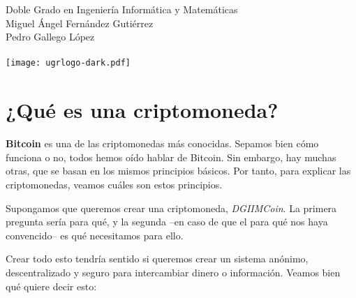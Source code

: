 \documentclass[10pt, a4paper]{article}
\theoremstyle{theorem-style}
\theoremstyle{theorem-style}
\theoremstyle{definition-style}
\theoremstyle{remark-style}
\theoremstyle{example-style}
\theoremstyle{definition-style}
\theoremstyle{remark-style}
\newcommand{\autor}{Miguel Ángel Fernández Gutiérrez\\Pedro Gallego López\\\hspace{1cm}}
\newcommand{\grado}{Doble Grado en Ingeniería Informática y Matemáticas}
\begin{document}
\begin{titlepage}

  \parbox[t]{\textwidth}{
  	\raggedright %
  	\fontsize{40pt}{40pt}\selectfont\sffamily{}
  }

	\vfill
	
	\parbox[t]{\textwidth}{
		\raggedright %
		\sffamily\large
		\grado\\
		{\Large \autor }\\[15pt]
		\texttt{[image: ugrlogo-dark.pdf]}
	}

\end{titlepage}


\thispagestyle{empty}
\tableofcontents
\newpage


\part{¿Qué es una criptomoneda?}\label{quuxe9-es-una-criptomoneda}

\textbf{Bitcoin} es una de las criptomonedas más conocidas. Sepamos bien
cómo funciona o no, todos hemos oído hablar de Bitcoin. Sin embargo, hay
muchas otras, que se basan en los mismos principios básicos. Por tanto,
para explicar las criptomonedas, veamos cuáles son estos principios.

Supongamos que queremos crear una criptomoneda, \emph{DGIIMCoin}. La
primera pregunta sería para qué, y la segunda --en caso de que el para
qué nos haya convencido-- es qué necesitamos para ello.

Crear todo esto tendría sentido si queremos crear un sistema anónimo,
descentralizado y seguro para intercambiar dinero o información. Veamos
bien qué quiere decir esto:
\end{document}
